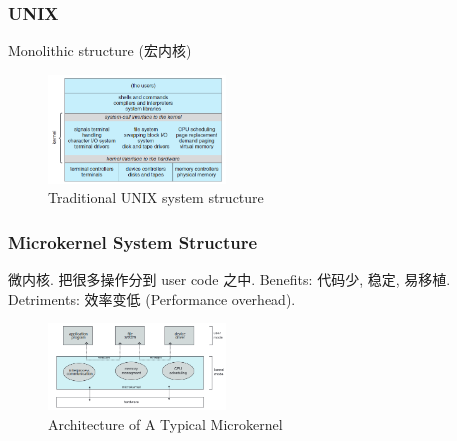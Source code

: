\subsubsection{UNIX}
Monolithic structure (宏内核) 
\begin{figure}[!htb]
    \centering
    \includegraphics[width=0.42\textwidth]{pic/OS2/Traditional UNIX system structure}
    \caption{Traditional UNIX system structure}
\end{figure}

\subsubsection{Microkernel System Structure}
微内核. 把很多操作分到 user code 之中. 
Benefits: 代码少, 稳定, 易移植. 
Detriments: 效率变低 (Performance overhead). 


\begin{figure}[!htb]
    \centering
    \includegraphics[width=0.42\textwidth]{pic/OS2/Architecture of A Typical Microkernel}
    \caption{Architecture of A Typical Microkernel}
\end{figure}






